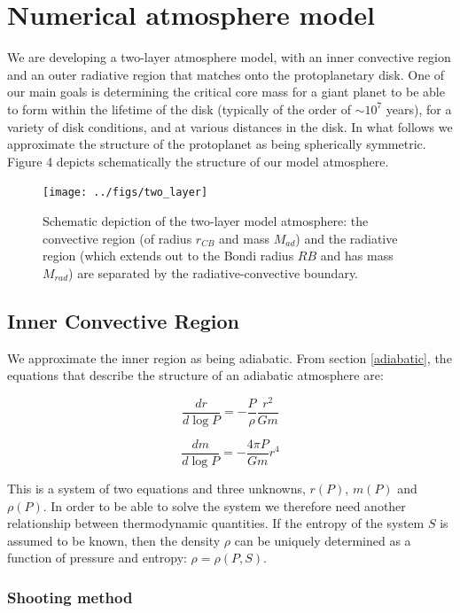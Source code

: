 \documentclass[apj]{emulateapj}
\begin{document}
\section{Numerical atmosphere model}

We are developing a two-layer atmosphere model, with an inner convective region and an outer radiative region that matches onto the protoplanetary disk. One of our main goals is determining the critical core mass for a giant planet to be able to form within the lifetime of the disk (typically of the order of $\sim 10^7$ years), for a variety of disk conditions, and at various distances in the disk. In what follows we approximate the structure of the protoplanet as being spherically symmetric. Figure 4 depicts schematically the structure of our model atmosphere.

\begin{figure}[h!]
\centering
\texttt{[image: ../figs/two\_layer]}
\caption{Schematic depiction of the two-layer model atmosphere: the convective region (of radius $r_{CB}$ and mass $M_{ad}$) and the radiative region (which extends out to the Bondi radius $RB$ and has mass $M_{rad}$) are separated by the radiative-convective boundary.}
\end{figure}

\subsection{Inner Convective Region}

We approximate the inner region as being adiabatic. From section \ref{adiabatic}, the equations that describe the structure of an adiabatic atmosphere are:

\begin{equation}
\label{eq:drdp2}
\frac{dr}{d\log P} = -\frac{P}{\rho} \frac{r^2}{G m}
\end{equation}

\begin{equation}
\label{eq:dmdp2}
\frac{dm}{d \log P} = -\frac{4 \pi P}{G m} r^4
\end{equation}

This is a system of two equations and three unknowns, $r(P)$, $m(P)$ and $\rho(P)$. In order to be able to solve the system we therefore need another relationship between thermodynamic quantities. If the entropy of the system $S$ is assumed to be known, then the density $\rho$ can be uniquely determined as a function of pressure and entropy: $\rho=\rho(P, S)$. 

\subsubsection{Shooting method}
\end{document}
